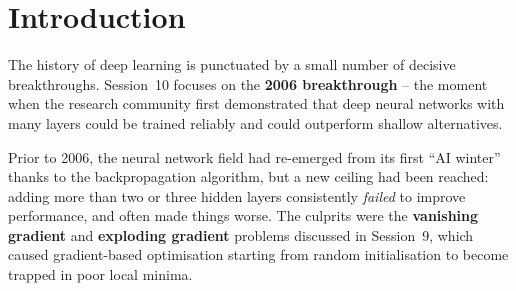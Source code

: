 \documentclass[12pt,a4paper]{article}
\begin{document}
\begin{titlepage}
  \begin{abstract}
    \noindent
    Session~10 covers the theoretical and empirical foundations of
    \emph{greedy layer-wise pre-training}, the pivotal technique introduced by
    Hinton et al.\ (2006) that made training deep networks feasible for the
    first time.  Starting from the observation that deep networks trained from
    random initialisation performed \emph{worse} than shallow networks due to
    vanishing/exploding gradients, the session explains how treating each hidden
    layer as a Restricted Boltzmann Machine (RBM) and pre-training it in
    isolation provides a principled weight initialisation.  The Bengio et al.\
    (2006, NIPS) supervised variant using auto-encoders is also presented.
    Landmark empirical results are reviewed: the deep generative model achieves
    1.25\% error on MNIST (vs.\ 1.4\% for SVM), and a DBN-DNN with 7 hidden
    layers achieves 17.1\% WER on the HUB500-SWB speech recognition benchmark
    (vs.\ 23.6\% for GMM-HMM).  The session concludes by contextualising why
    greedy pre-training is less necessary today given modern regularisation and
    optimisation advances (ReLU, batch normalisation, Adam), while noting its
    continued relevance for low-resource settings.
  \end{abstract}
\end{titlepage}


\newpage

\section{Introduction}
\label{sec:intro}

The history of deep learning is punctuated by a small number of decisive
breakthroughs.  Session~10 focuses on the \textbf{2006 breakthrough} -- the
moment when the research community first demonstrated that deep neural networks
with many layers could be trained reliably and could outperform shallow
alternatives.

Prior to 2006, the neural network field had re-emerged from its first ``AI
winter'' thanks to the backpropagation algorithm, but a new ceiling had been
reached: adding more than two or three hidden layers consistently \emph{failed}
to improve performance, and often made things worse.  The culprits were the
\textbf{vanishing gradient} and \textbf{exploding gradient} problems discussed
in Session~9, which caused gradient-based optimisation starting from random
initialisation to become trapped in poor local minima.
\end{document}
